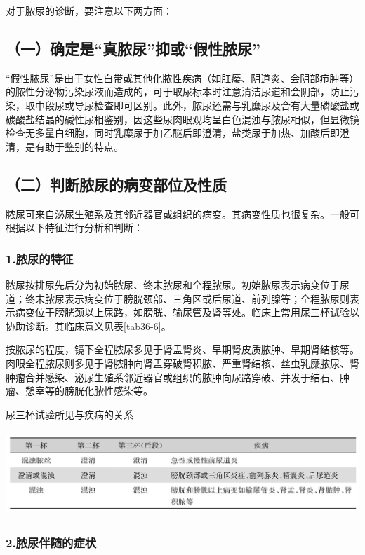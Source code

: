 对于脓尿的诊断，要注意以下两方面：

\subsection{（一）确定是“真脓尿”抑或“假性脓尿”}

“假性脓尿”是由于女性白带或其他化脓性疾病（如肛瘘、阴道炎、会阴部疖肿等）的脓性分泌物污染尿液而造成的，可于取尿标本时注意清洁尿道和会阴部，防止污染，取中段尿或导尿检查即可区别。此外，脓尿还需与乳糜尿及合有大量磷酸盐或碳酸盐结晶的碱性尿相鉴别，因这些尿肉眼观均呈白色混浊与脓尿相似，但显微镜检查无多量白细胞，同时乳糜尿于加乙醚后即澄清，盐类尿于加热、加酸后即澄清，是有助于鉴别的特点。

\subsection{（二）判断脓尿的病变部位及性质}

脓尿可来自泌尿生殖系及其邻近器官或组织的病变。其病变性质也很复杂。一般可根据以下特征进行分析和判断：

\subsubsection{1.脓尿的特征}

脓尿按排尿先后分为初始脓尿、终末脓尿和全程脓尿。初始脓尿表示病变位于尿道；终末脓尿表示病变位于膀胱颈部、三角区或后尿道、前列腺等；全程脓尿则表示病变位于膀胱颈以上尿路，如膀胱、输尿管及肾等处。临床上常用尿三杯试验以协助诊断。其临床意义见表\ref{tab36-6}。

按脓尿的程度，镜下全程脓尿多见于肾盂肾炎、早期肾皮质脓肿、早期肾结核等。肉眼全程脓尿则多见于肾脓肿向肾盂穿破肾积脓、严重肾结核、丝虫乳糜脓尿、肾肿瘤合并感染、泌尿生殖系邻近器官或组织的脓肿向尿路穿破、并发于结石、肿瘤、憩室等的膀胱化脓性感染等。

\begin{table}[htbp]
\centering
\caption{尿三杯试验所见与疾病的关系}
\label{tab36-6}
\includegraphics[width=5.94792in,height=1.25in]{./images/Image00229.jpg}
\end{table}

\subsubsection{2.脓尿伴随的症状}

